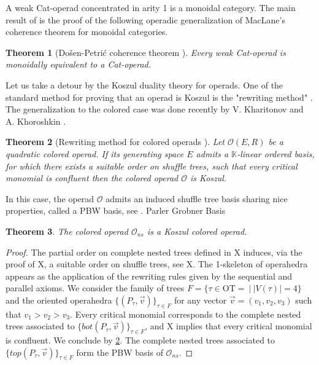 \documentclass[10pt]{amsart}
\newtheorem{thm}{Theorem}[section]
\theoremstyle{definition}
\theoremstyle{remark}
\numberwithin{equation}{section}
\newcommand{\0}{\color{blue}{\mathsf{0}}}
\begin{document}
A weak Cat-operad concentrated in arity 1 is a monoidal category. The main result of \cite{DP15} is the proof of the following operadic generalization of MacLane's coherence theorem for monoidal categories.

\begin{thm}[Do\v sen-Petri\'c coherence theorem {\cite[Proposition 14.2]{DP15}}] Every weak Cat-operad is monoidally equivalent to a Cat-operad.
\end{thm}

Let us take a detour by the Koszul duality theory for operads. One of the standard method for proving that an operad is Koszul is the "rewriting method" \cite[Section 8.3]{LodayVallette12}. The generalization to the colored case was done recently by V. Kharitonov and A. Khoroshkin \cite[Theorem 3.12]{KhariKhoro20}.

\begin{thm}[Rewriting method for colored operads {\cite[Theorem 8.3.1]{LodayVallette12}}] \label{thm:rewriting} Let $\mathcal{O}(E,R)$ be a quadratic colored operad. If its generating space $E$ admits a $\mathbb{K}$-linear ordered basis, for which there exists a suitable order on shuffle trees, such that every critical monomial is confluent then the colored operad $\mathcal{O}$ is Koszul. 
\end{thm}

In this case, the operad $\mathcal{O}$ admits an induced shuffle tree basis sharing nice properties, called a PBW basis, see \cite[Section 8.5.3]{LodayVallette12}. Parler Grobner Basis

\begin{thm} \label{thm:Koszulrewriting} The colored operad $\mathcal{O}_{ns}$ is a Koszul colored operad. 
\end{thm}
\begin{proof} The partial order on complete nested trees defined in X induces, via the proof of X, a suitable order on shuffle trees, see X. The 1-skeleton of operahedra appears as the application of the rewriting rules given by the sequential and parallel axioms. We consider the family of trees $F=\{\tau \in \mathrm{OT}=\ | \ |V(\tau)|=4\}$ and the oriented operahedra $\{(P_\tau,\vec v)\}_{\tau \in F}$ for any vector $\vec v=(v_1,v_2,v_3)$ such that $v_1>v_2>v_3$. Every critical monomial corresponds to the complete nested trees associated to $\{bot(P_\tau,\vec v)\}_{\tau \in F}$, and X implies that every critical monomial is confluent. We conclude by \cref{thm:rewriting}. 
The complete nested trees associated to $\{top(P_\tau, \vec v)\}_{\tau \in F}$ form the PBW basis of $\mathcal{O}_{ns}$.
\end{proof}
\end{document}
